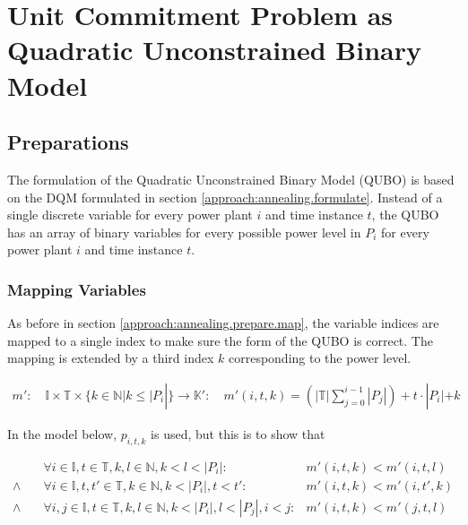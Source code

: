 \section{Unit Commitment Problem as Quadratic Unconstrained Binary Model}

\subsection{Preparations}

The formulation of the Quadratic Unconstrained Binary Model (QUBO) is based on the DQM formulated in section \ref{approach:annealing.formulate}.
Instead of a single discrete variable for every power plant $i$ and time instance $t$, the QUBO has an array of binary variables for every possible power level in $P_i$ for every power plant $i$ and time instance $t$.

\subsubsection{Mapping Variables}

As before in section \ref{approach:annealing.prepare.map}, the variable indices are mapped to a single index to make sure the form of the QUBO is correct.
The mapping is extended by a third index $k$ corresponding to the power level.

\begin{align}
  m':
  \quad
  \mathbb{I}
  \times \mathbb{T}
  \times \{k \in \mathbb{N} | k \leq |P_i|\} \to \mathbb{K}':
  \quad
  m'(i, t, k) = \left( |\mathbb{T}| \sum_{j=0}^{i-1} |P_j| \right)
  + t \cdot |P_i|
  + k
  \label{formula:qubo.mapping}
\end{align}

In the model below, $p_{i,t,k}$ is used, but this is to show that

\begin{subequations}
\begin{align}
  &
  \forall i \in \mathbb{I}, t \in \mathbb{T}, k, l \in \mathbb{N}, k < l < |P_i|:
  &
  m'(i, t, k) < m'(i, t, l)
  \\
  \land \quad
  &
  \forall i \in \mathbb{I}, t, t' \in \mathbb{T}, k \in \mathbb{N}, k < |P_i|, t < t':
  &
  m'(i, t, k) < m'(i, t', k)
  \\
  \land \quad
  &
  \forall i, j \in \mathbb{I}, t  \in \mathbb{T}, k, l \in \mathbb{N}, k < |P_i|, l < |P_j|, i < j:
  &
  m'(i, t, k) < m'(j, t, l)
\end{align}
\end{subequations}


